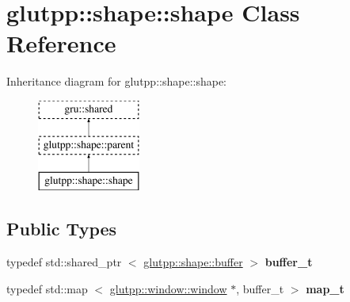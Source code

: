 \hypertarget{classglutpp_1_1shape_1_1shape}{\section{glutpp\-:\-:shape\-:\-:shape \-Class \-Reference}
\label{classglutpp_1_1shape_1_1shape}
}
\-Inheritance diagram for glutpp\-:\-:shape\-:\-:shape\-:\begin{figure}[H]
\begin{center}
\leavevmode
\includegraphics[height=3.000000cm]{classglutpp_1_1shape_1_1shape}
\end{center}
\end{figure}
\subsection*{\-Public \-Types}
\begin{DoxyCompactItemize}
\item 
\hypertarget{classglutpp_1_1shape_1_1shape_a571f41fec25897cb9cf4935692aa141d}{typedef std\-::shared\-\_\-ptr\*
$<$ \hyperlink{classglutpp_1_1shape_1_1buffer}{glutpp\-::shape\-::buffer} $>$ {\bfseries buffer\-\_\-t}}\label{classglutpp_1_1shape_1_1shape_a571f41fec25897cb9cf4935692aa141d}

\item 
\hypertarget{classglutpp_1_1shape_1_1shape_af5023860ac048fbca618dbf193df2209}{typedef std\-::map\*
$<$ \hyperlink{classglutpp_1_1window_1_1window}{glutpp\-::window\-::window} \*
$\ast$, buffer\-\_\-t $>$ {\bfseries map\-\_\-t}}\label{classglutpp_1_1shape_1_1shape_af5023860ac048fbca618dbf193df2209}

\end{DoxyCompactItemize}
